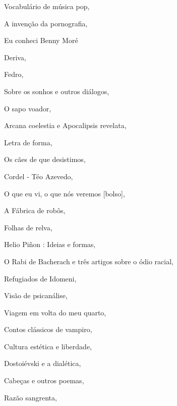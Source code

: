 \begin{multicols}{2}
\begin{enumerate}
{\item Vocabulário de música pop, {}
\item A invenção da pornografia, {}
\item Eu conheci Benny Moré
\item Deriva, {}
\item Fedro, {}
\item Sobre os sonhos e outros diálogos, {}
\item O sapo voador, {}
\item Arcana coelestia e Apocalipsis revelata, {}
\item Letra de forma, {}
\item Os cães de que desistimos, {}
\item Cordel - Téo Azevedo, {}
\item O que eu vi, o que nós veremos [bolso], {}
\item A Fábrica de robôs, {}
\item Folhas de relva, {}
\item Helio Piñon : Ideias e formas, {}
\item O Rabi de Bacherach e três artigos sobre o ódio racial, {}
\item Refugiados de Idomeni, {}
\item Visão de psicanálise, {}
\item Viagem em volta do meu quarto, {}
\item Contos clássicos de vampiro, {}
\item Cultura estética e liberdade, {}
\item Dostoiévski e a dialética, {}
\item Cabeças e outros poemas, {}
\item Razão sangrenta, {}
}
\end{enumerate}
\end{multicols}
